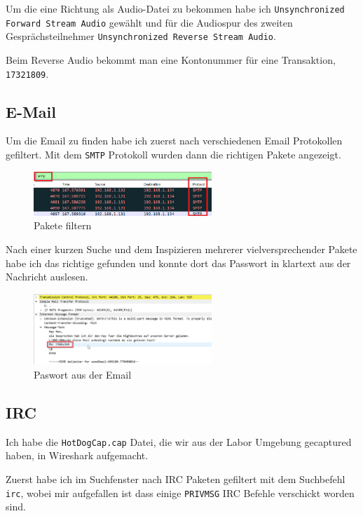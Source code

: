\documentclass[12pt,a4paper,titlepage,oneside]{scrartcl}
\begin{document}
Um die eine Richtung als Audio-Datei zu bekommen habe ich \lstinline{Unsynchronized Forward Stream Audio} gewählt und für die Audiospur des zweiten Gesprächsteilnehmer \lstinline{Unsynchronized Reverse Stream Audio}.

Beim Reverse Audio bekommt man eine Kontonummer für eine Transaktion, \lstinline{17321809}.

\subsection{E-Mail}
Um die Email zu finden habe ich zuerst nach verschiedenen Email Protokollen gefiltert.
Mit dem \lstinline{SMTP} Protokoll wurden dann die richtigen Pakete angezeigt.

\begin{figure}[h!]
  \centering
    \includegraphics[width=0.6\textwidth]{./imgs/intranet_screenshots/smtp_filter.png}
  \caption{Pakete filtern}
  \label{fig:smtp_filter}
\end{figure}

Nach einer kurzen Suche und dem Inspizieren mehrerer vielversprechender Pakete habe ich das richtige gefunden und konnte dort das Passwort in klartext aus der Nachricht auslesen.

\begin{figure}[h!]
  \centering
    \includegraphics[width=0.6\textwidth]{./imgs/intranet_screenshots/email_pw.png}
  \caption{Paswort aus der Email}
  \label{fig:email_pw}
\end{figure}

\subsection{IRC}

Ich habe die \lstinline{HotDogCap.cap} Datei, die wir aus der Labor Umgebung gecaptured haben, in Wireshark aufgemacht.

Zuerst habe ich im Suchfenster nach IRC Paketen gefiltert mit dem Suchbefehl \lstinline{irc}, wobei mir aufgefallen ist dass einige \lstinline{PRIVMSG} IRC Befehle verschickt worden sind.
\end{document}
